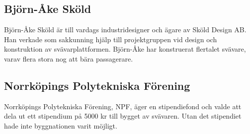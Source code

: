 \subsection{Björn-Åke Sköld}
Björn-Åke Sköld är till vardags industridesigner och ägare av Sköld Design AB.
Han verkade som sakkunning hjälp till projektgruppen vid design och konstruktion
av svävarplattformen. Björn-Åke har konstruerat flertalet svävare, varav flera
stora nog att bära passagerare.

\subsection{Norrköpings Polytekniska Förening}
Norrköpings Polytekniska Förening, NPF, äger en stipendiefond och valde att dela
ut ett stipendium på 5000 kr till bygget av svävaren. Utan det stipendiet hade
inte byggnationen varit möjligt.
